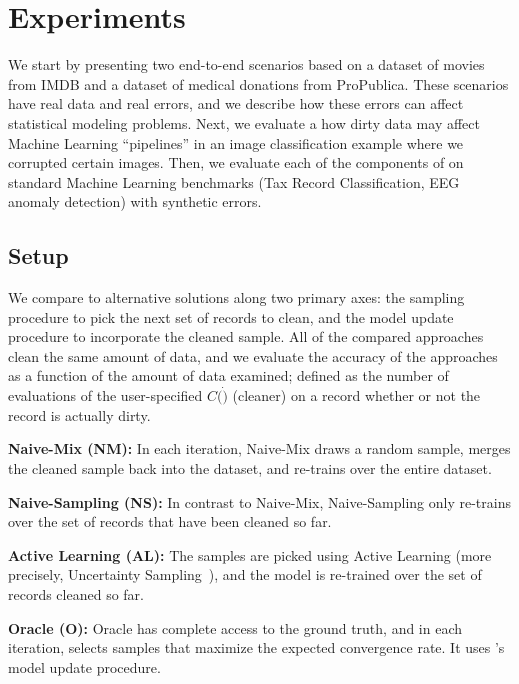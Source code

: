 \section{Experiments}\label{eval}
We start by presenting two end-to-end scenarios based on a dataset of movies from IMDB and a dataset of medical donations from ProPublica.
These scenarios have real data and real errors, and we describe how these errors can affect statistical modeling problems.
Next, we evaluate a how dirty data may affect Machine Learning ``pipelines'' in an image classification example where we corrupted certain images.
Then, we evaluate each of the components of \sys on standard Machine Learning benchmarks (Tax Record Classification, EEG anomaly detection) with synthetic errors.

\subsection{Setup}
We compare \sys to alternative solutions along two primary axes: the sampling procedure to pick the next set of records to clean, and the model update procedure to incorporate the cleaned sample.
All of the compared approaches clean the same amount of data, and we evaluate the accuracy of the approaches as a function of the amount of data examined; defined as the number of evaluations of the user-specified $C(\dot)$ (cleaner) on a record whether or not the record is actually dirty.

\vspace{0.25em}
\noindent\textbf{Naive-Mix (NM): } In each iteration, Naive-Mix  draws a random sample, merges the cleaned sample back into the dataset, and re-trains over the entire dataset.

\vspace{0.25em}
\noindent\textbf{Naive-Sampling (NS): } In contrast to Naive-Mix, Naive-Sampling only re-trains over the set of records that have been cleaned so far.

\vspace{0.25em}
\noindent\textbf{Active Learning (AL): }
The samples are picked using Active Learning (more precisely, Uncertainty Sampling~\cite{settles2010active}), and the model is re-trained over the set of records cleaned so far.

\vspace{0.25em}
\noindent\textbf{Oracle (O): } Oracle has complete access to the ground truth, and in each iteration, selects samples that maximize the expected convergence rate.  It uses \sys's model update procedure.  

